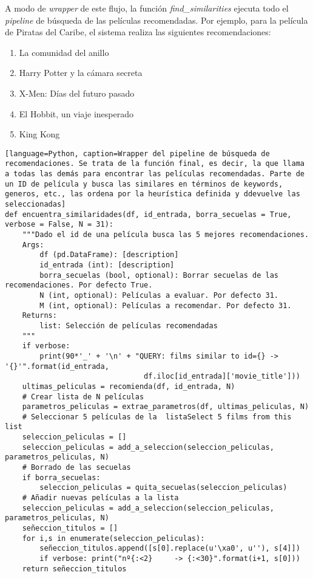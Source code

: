 A modo de \textit{wrapper} de este flujo, la función \textit{find\_similarities} ejecuta todo el \textit{pipeline} de búsqueda de las películas recomendadas. Por ejemplo, para la película de Piratas del Caribe, el sistema realiza las siguientes recomendaciones:

\begin{enumerate}
    \item La comunidad del anillo
    \item Harry Potter y la cámara secreta
    \item X-Men: Días del futuro pasado
    \item El Hobbit, un viaje inesperado
    \item King Kong
\end{enumerate}

\begin{lstlisting}[language=Python, caption=Wrapper del pipeline de búsqueda de recomendaciones. Se trata de la función final, es decir, la que llama a todas las demás para encontrar las películas recomendadas. Parte de un ID de película y busca las similares en términos de keywords, generos, etc., las ordena por la heurística definida y ddevuelve las seleccionadas]
def encuentra_similaridades(df, id_entrada, borra_secuelas = True, verbose = False, N = 31):
    """Dado el id de una película busca las 5 mejores recomendaciones.
    Args:
        df (pd.DataFrame): [description]
        id_entrada (int): [description]
        borra_secuelas (bool, optional): Borrar secuelas de las recomendaciones. Por defecto True.
        N (int, optional): Películas a evaluar. Por defecto 31.
        M (int, optional): Películas a recomendar. Por defecto 31.
    Returns:
        list: Selección de películas recomendadas
    """
    if verbose: 
        print(90*'_' + '\n' + "QUERY: films similar to id={} -> '{}'".format(id_entrada,
                                df.iloc[id_entrada]['movie_title']))
    ultimas_peliculas = recomienda(df, id_entrada, N)
    # Crear lista de N películas
    parametros_peliculas = extrae_parametros(df, ultimas_peliculas, N)
    # Seleccionar 5 películas de la  listaSelect 5 films from this list
    seleccion_peliculas = []
    seleccion_peliculas = add_a_seleccion(seleccion_peliculas, parametros_peliculas, N)
    # Borrado de las secuelas
    if borra_secuelas: 
        seleccion_peliculas = quita_secuelas(seleccion_peliculas)
    # Añadir nuevas películas a la lista
    seleccion_peliculas = add_a_seleccion(seleccion_peliculas, parametros_peliculas, N)
    señeccion_titulos = []
    for i,s in enumerate(seleccion_peliculas):
        señeccion_titulos.append([s[0].replace(u'\xa0', u''), s[4]])
        if verbose: print("nº{:<2}     -> {:<30}".format(i+1, s[0]))
    return señeccion_titulos
\end{lstlisting}

